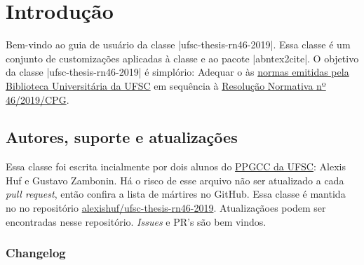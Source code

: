 \documentclass[]{ufsc-thesis-rn46-2019}
\begin{document}

\pretextual%
\imprimircapa%
\imprimirfolhaderosto*
\clearpage %

\clearpage
\imprimirfolhadecertificacao
\listoffigures*
\cleardoublepage
\tableofcontents*%

\textual%

\chapter{Introdução}

Bem-vindo ao guia de usuário da classe \mt|ufsc-thesis-rn46-2019|. Essa classe é um conjunto de customizações aplicadas à classe \href{https://ctan.org/pkg/abntex2}{\abnTeX} e ao pacote \mt|abntex2cite|. O objetivo da classe \mt|ufsc-thesis-rn46-2019| é simplório: Adequar o \abnTeX às \href{http://portal.bu.ufsc.br/normalizacao/}{normas emitidas pela Biblioteca Universitária da UFSC} em sequência à \href{https://repositorio.ufsc.br/handle/123456789/197121}{Resolução Normativa nº 46/2019/CPG}.


\section{Autores, suporte e atualizações}

Essa classe foi escrita incialmente por dois alunos do \href{http://ppgcc.posgrad.ufsc.br/}{PPGCC da UFSC}: Alexis Huf e Gustavo Zambonin. Há o risco de esse arquivo não ser atualizado a cada \textit{pull request}, então confira a lista de mártires no GitHub. Essa classe é mantida no no repositório \href{https://github.com/alexishuf/ufsc-thesis-rn46-2019/}{alexishuf/ufsc-thesis-rn46-2019}. Atualizaçãoes podem ser encontradas nesse repositório. \textit{Issues} e PR's são bem vindos.

\subsection{Changelog}
\end{document}
